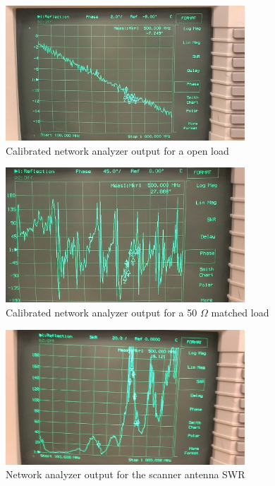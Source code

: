\documentclass{article}
\begin{document}
\begin{figure}[H]
    \centering
    \includegraphics[width=0.8\textwidth]{./Images/NetOpen.jpg}
    \caption{Calibrated network analyzer output for a open load}
\end{figure}
\begin{figure}[H]
    \centering
    \includegraphics[width=0.8\textwidth]{./Images/NetMatch.jpg}
    \caption{Calibrated network analyzer output for a 50 $\Omega$ matched load}
\end{figure}
\begin{figure}[H]
    \centering
    \includegraphics[width=0.8\textwidth]{./Images/NetSWR.jpg}
    \caption{Network analyzer output for the scanner antenna SWR}
\end{figure}
\end{document}
